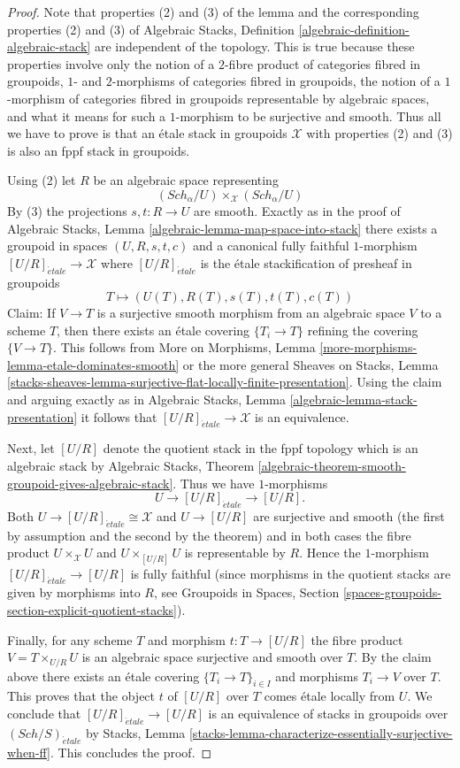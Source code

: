 \documentclass{stacks-project}
\theoremstyle{plain}
\theoremstyle{definition}
\theoremstyle{remark}
\numberwithin{equation}{subsection}
\def\Sch{\mathit{Sch}}
\def\etale{{\acute{e}tale}}
\begin{document}
\begin{proof}
Note that properties (2) and (3) of the lemma and the corresponding
properties (2) and (3) of
Algebraic Stacks, Definition \ref{algebraic-definition-algebraic-stack}
are independent of the topology. This is true because these properties
involve only the notion of a $2$-fibre product of categories fibred in
groupoids, $1$- and $2$-morphisms of categories fibred in groupoids, the
notion of a $1$-morphism of categories fibred in groupoids representable
by algebraic spaces, and what it means for such a $1$-morphism to be
surjective and smooth.
Thus all we have to prove is that an \'etale stack in groupoids
$\mathcal{X}$ with properties (2) and (3) is also an fppf stack in groupoids.

\medskip\noindent
Using (2) let $R$ be an algebraic space representing
$$
(\Sch_\alpha/U) \times_\mathcal{X} (\Sch_\alpha/U)
$$
By (3) the projections $s, t : R \to U$ are smooth. Exactly as in the proof of
Algebraic Stacks, Lemma \ref{algebraic-lemma-map-space-into-stack}
there exists a groupoid in spaces $(U, R, s, t, c)$ and a canonical
fully faithful $1$-morphism $[U/R]_\etale \to \mathcal{X}$
where $[U/R]_\etale$ is the \'etale stackification of presheaf
in groupoids
$$
T \longmapsto (U(T), R(T), s(T), t(T), c(T))
$$
Claim: If $V \to T$ is a surjective smooth morphism from an algebraic space
$V$ to a scheme $T$, then there exists an \'etale covering $\{T_i \to T\}$
refining the covering $\{V \to T\}$. This follows from
More on Morphisms, Lemma \ref{more-morphisms-lemma-etale-dominates-smooth}
or the more general
Sheaves on Stacks, Lemma
\ref{stacks-sheaves-lemma-surjective-flat-locally-finite-presentation}.
Using the claim and arguing exactly as in
Algebraic Stacks, Lemma \ref{algebraic-lemma-stack-presentation}
it follows that $[U/R]_\etale \to \mathcal{X}$ is an
equivalence.

\medskip\noindent
Next, let $[U/R]$ denote the quotient stack in the fppf topology
which is an algebraic stack by
Algebraic Stacks, Theorem
\ref{algebraic-theorem-smooth-groupoid-gives-algebraic-stack}.
Thus we have $1$-morphisms
$$
U \to [U/R]_\etale \to [U/R].
$$
Both $U \to [U/R]_\etale \cong \mathcal{X}$ and
$U \to [U/R]$ are surjective and smooth (the first by assumption
and the second by the theorem) and in both cases the
fibre product $U \times_\mathcal{X} U$ and $U \times_{[U/R]} U$
is representable by $R$. Hence the $1$-morphism
$[U/R]_\etale \to [U/R]$ is fully faithful (since morphisms
in the quotient stacks are given by morphisms into $R$, see
Groupoids in Spaces, Section
\ref{spaces-groupoids-section-explicit-quotient-stacks}).

\medskip\noindent
Finally, for any scheme $T$ and morphism $t : T \to [U/R]$ the fibre product
$V = T \times_{U/R} U$ is an algebraic space surjective and smooth over $T$.
By the claim above there exists an \'etale covering $\{T_i \to T\}_{i \in I}$
and morphisms $T_i \to V$ over $T$. This proves that the object
$t$ of $[U/R]$ over $T$ comes \'etale locally from $U$. We conclude that
$[U/R]_\etale \to [U/R]$ is an equivalence of stacks in
groupoids over $(\Sch/S)_\etale$ by
Stacks, Lemma \ref{stacks-lemma-characterize-essentially-surjective-when-ff}.
This concludes the proof.
\end{proof}














\end{document}
